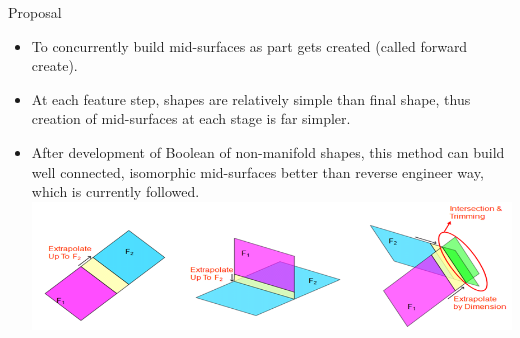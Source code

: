 
\begin{frame}[<+-| alert@+>]{Proposal}

\begin{itemize}[noitemsep,label=\textbullet,topsep=2pt,parsep=2pt,partopsep=2pt]
\item To concurrently build mid-surfaces as part gets created (called forward create). 
\item At each feature step, shapes are relatively simple than final shape, thus creation of mid-surfaces at each stage is far simpler.
\item After development of Boolean of non-manifold shapes, this method can build well connected, isomorphic mid-surfaces better than reverse engineer way, which is currently followed.
\includegraphics[scale=0.4]{../Common/images/ExtendTrim.png}

\end{itemize}
\end{frame}




